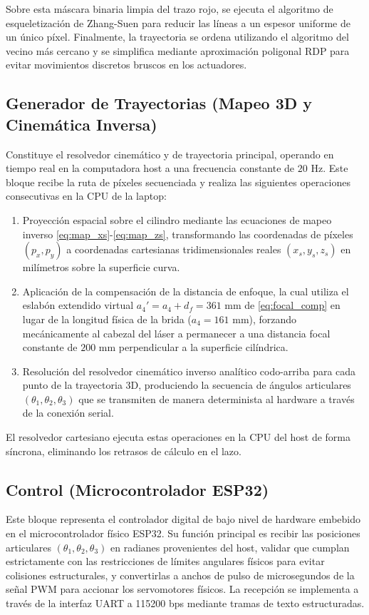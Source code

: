 \documentclass[conference,a4paper]{IEEEtran}
\begin{document}
Sobre esta máscara binaria limpia del trazo rojo, se ejecuta el algoritmo de esqueletización de Zhang-Suen para reducir las líneas a un espesor uniforme de un único píxel. Finalmente, la trayectoria se ordena utilizando el algoritmo del vecino más cercano y se simplifica mediante aproximación poligonal RDP para evitar movimientos discretos bruscos en los actuadores.

\subsection{Generador de Trayectorias (Mapeo 3D y Cinemática Inversa)}
Constituye el resolvedor cinemático y de trayectoria principal, operando en tiempo real en la computadora host a una frecuencia constante de $20\text{ Hz}$. Este bloque recibe la ruta de píxeles secuenciada y realiza las siguientes operaciones consecutivas en la CPU de la laptop:
\begin{enumerate}
    \item Proyección espacial sobre el cilindro mediante las ecuaciones de mapeo inverso \eqref{eq:map_xs}-\eqref{eq:map_zs}, transformando las coordenadas de píxeles $(p_x, p_y)$ a coordenadas cartesianas tridimensionales reales $(x_s, y_s, z_s)$ en milímetros sobre la superficie curva.
    \item Aplicación de la compensación de la distancia de enfoque, la cual utiliza el eslabón extendido virtual $a_4' = a_4 + d_f = 361\text{ mm}$ de \eqref{eq:focal_comp} en lugar de la longitud física de la brida ($a_4 = 161\text{ mm}$), forzando mecánicamente al cabezal del láser a permanecer a una distancia focal constante de $200\text{ mm}$ perpendicular a la superficie cilíndrica.
    \item Resolución del resolvedor cinemático inverso analítico codo-arriba para cada punto de la trayectoria 3D, produciendo la secuencia de ángulos articulares $(\theta_1, \theta_2, \theta_3)$ que se transmiten de manera determinista al hardware a través de la conexión serial.
\end{enumerate}
El resolvedor cartesiano ejecuta estas operaciones en la CPU del host de forma síncrona, eliminando los retrasos de cálculo en el lazo.

\subsection{Control (Microcontrolador ESP32)}
Este bloque representa el controlador digital de bajo nivel de hardware embebido en el microcontrolador físico ESP32. Su función principal es recibir las posiciones articulares $(\theta_1, \theta_2, \theta_3)$ en radianes provenientes del host, validar que cumplan estrictamente con las restricciones de límites angulares físicos para evitar colisiones estructurales, y convertirlas a anchos de pulso de microsegundos de la señal PWM para accionar los servomotores físicos. La recepción se implementa a través de la interfaz UART a 115200 bps mediante tramas de texto estructuradas.
\end{document}
